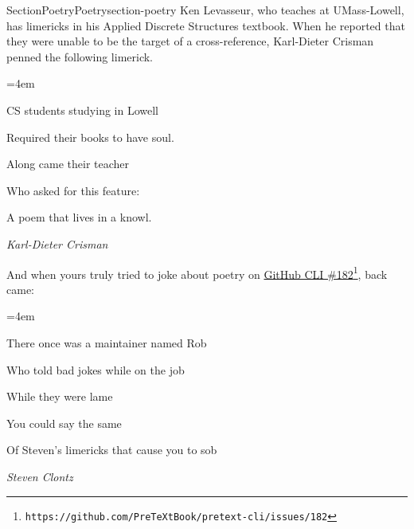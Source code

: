 \documentclass[twoside,10pt,]{article}
\numberwithin{equation}{section}
\newenvironment{poem}{\setlength{\parindent}{0em}}{}
\newcommand{\poemTitle}[1]{\begin{center}\large\textbf{#1}\end{center}}
\newenvironment{stanza}{\vspace{0.25 em}\hangindent=4em}{\vspace{1 em}}
\newcommand{\poemauthorleft}[1]{\vspace{-1em}\begin{flushleft}\textit{#1}\end{flushleft}}
\newcommand{\poemlineleft}[1]{{\raggedright{#1}\par}\vspace{-\parskip}}
\begin{document}
\begin{sectionptx}{Section}{Poetry}{}{Poetry}{}{}{section-poetry}
Ken Levasseur, who teaches at UMass-Lowell, has limericks in his Applied Discrete Structures textbook.  When he reported that they were unable to be the target of a cross-reference, Karl-Dieter Crisman penned the following limerick.%
\begin{poem}%
\poemTitle{}
\begin{stanza}
\poemlineleft{CS students studying in Lowell}
\poemlineleft{Required their books to have soul.}
\poemlineleft{Along came their teacher}
\poemlineleft{Who asked for this feature:}
\poemlineleft{A poem that lives in a knowl.}
\end{stanza}
\poemauthorleft{Karl-Dieter Crisman}
\end{poem}
And when yours truly tried to joke about poetry on \href{https://github.com/PreTeXtBook/pretext-cli/issues/182}{GitHub CLI \#182}\footnote{\nolinkurl{https://github.com/PreTeXtBook/pretext-cli/issues/182}\label{section-poetry-6-2}}, back came:%
\begin{poem}\label{limerick-clontz}%
\poemTitle{}
\begin{stanza}
\poemlineleft{There once was a maintainer named Rob}
\poemlineleft{Who told bad jokes while on the job}
\poemlineleft{While they were lame}
\poemlineleft{You could say the same}
\poemlineleft{Of Steven's limericks that cause you to sob}
\end{stanza}
\poemauthorleft{Steven Clontz}
\end{poem}
\end{sectionptx}
%
%
\typeout{************************************************}
\typeout{************************************************}
%
\end{document}
